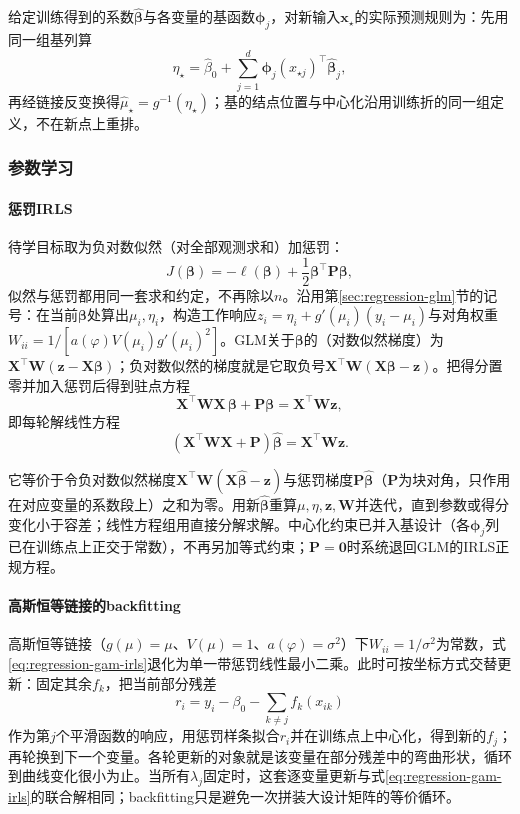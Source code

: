 给定训练得到的系数$\widehat{\bm{\beta}}$与各变量的基函数$\bm{\phi}_j$，对新输入$\bm{x}_\star$的实际预测规则为：先用同一组基列算
\[
  \eta_\star=\widehat\beta_0+\sum_{j=1}^d\bm{\phi}_j(x_{\star j})^{\top}\widehat{\bm{\beta}}_j,
\]
再经链接反变换得$\widehat\mu_\star=g^{-1}(\eta_\star)$；基的结点位置与中心化沿用训练折的同一组定义，不在新点上重排。

\subsubsection{参数学习}
\label{sec:regression-gam-learning}

\paragraph{惩罚IRLS}

待学目标取为负对数似然（对全部观测求和）加惩罚：
\[
  J(\bm{\beta})=-\ell(\bm{\beta})+\frac12\bm{\beta}^{\top}\bm{P}\bm{\beta},
\]
似然与惩罚都用同一套求和约定，不再除以$n$。沿用第\ref{sec:regression-glm}节的记号：在当前$\bm{\beta}$处算出$\mu_i,\eta_i$，构造工作响应$z_i=\eta_i+g'(\mu_i)(y_i-\mu_i)$与对角权重$W_{ii}=1/[a(\varphi)V(\mu_i)g'(\mu_i)^2]$。GLM关于$\bm{\beta}$的（对数似然梯度）为$\bm{X}^{\top}\bm{W}(\bm{z}-\bm{X}\bm{\beta})$；负对数似然的梯度就是它取负号$\bm{X}^{\top}\bm{W}(\bm{X}\bm{\beta}-\bm{z})$。把得分置零并加入惩罚后得到驻点方程
\[
  \bm{X}^{\top}\bm{W}\bm{X}\,\bm{\beta}
  +\bm{P}\bm{\beta}
  =\bm{X}^{\top}\bm{W}\bm{z},
\]
即每轮解线性方程
\begin{equation}
  \left(\bm{X}^{\top}\bm{W}\bm{X}+\bm{P}\right)\widehat{\bm{\beta}}
  =\bm{X}^{\top}\bm{W}\bm{z}.
  \label{eq:regression-gam-irls}
\end{equation}

它等价于令负对数似然梯度$\bm{X}^{\top}\bm{W}(\bm{X}\widehat{\bm{\beta}}-\bm{z})$与惩罚梯度$\bm{P}\widehat{\bm{\beta}}$（$\bm{P}$为块对角，只作用在对应变量的系数段上）之和为零。用新$\widehat{\bm{\beta}}$重算$\mu,\eta,\bm{z},\bm{W}$并迭代，直到参数或得分变化小于容差；线性方程组用直接分解求解。中心化约束已并入基设计（各$\bm{\phi}_j$列已在训练点上正交于常数），不再另加等式约束；$\bm{P}=\bm 0$时系统退回GLM的IRLS正规方程。

\paragraph{高斯恒等链接的backfitting}

高斯恒等链接（$g(\mu)=\mu$、$V(\mu)=1$、$a(\varphi)=\sigma^2$）下$W_{ii}=1/\sigma^2$为常数，式\eqref{eq:regression-gam-irls}退化为单一带惩罚线性最小二乘。此时可按坐标方式交替更新：固定其余$f_k$，把当前部分残差
\[
  r_i=y_i-\beta_0-\sum_{k\ne j}f_k(x_{ik})
\]
作为第$j$个平滑函数的响应，用惩罚样条拟合$r_i$并在训练点上中心化，得到新的$f_j$；再轮换到下一个变量。各轮更新的对象就是该变量在部分残差中的弯曲形状，循环到曲线变化很小为止。当所有$\lambda_j$固定时，这套逐变量更新与式\eqref{eq:regression-gam-irls}的联合解相同；backfitting只是避免一次拼装大设计矩阵的等价循环。

